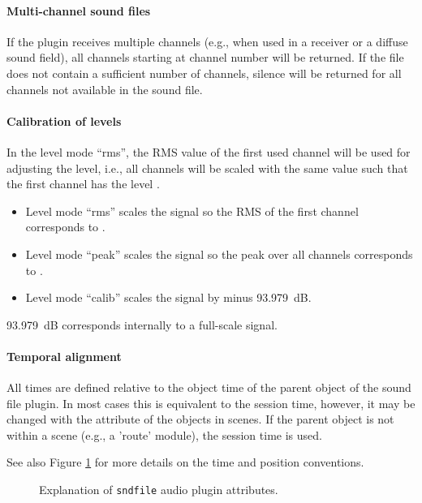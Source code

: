 \paragraph{Multi-channel sound files}
%
If the plugin receives multiple channels (e.g., when used in a
receiver or a diffuse sound field), all channels starting at channel
number  will be returned. If the file does not contain a
sufficient number of channels, silence will be returned for all
channels not available in the sound file.

\paragraph{Calibration of levels}
%
In the level mode ``rms'', the RMS value of the first used channel
will be used for adjusting the level, i.e., all channels will be
scaled with the same value such that the first channel has the
level .
\begin{itemize}
\item Level mode ``rms'' scales the signal so the RMS of the first channel corresponds to .

\item Level mode ``peak'' scales the signal so the peak over all channels corresponds to .

\item Level mode ``calib'' scales the signal by  minus 93.979~dB.
\end{itemize}
93.979~dB corresponds internally to a full-scale signal.

\paragraph{Temporal alignment}
%
All times are defined relative to the object time of the parent object
of the sound file plugin. In most cases this is equivalent to the
session time, however, it may be changed with the 
attribute of the objects in scenes. If the parent object is not within
a scene (e.g., a 'route' module), the session time is used.

See also Figure \ref{fig:ap_sndfile} for more details on the time and position conventions.

\begin{figure}[htb]
    \centering
    \caption{Explanation of {\tt sndfile} audio plugin attributes.}
    \label{fig:ap_sndfile}
\end{figure}

